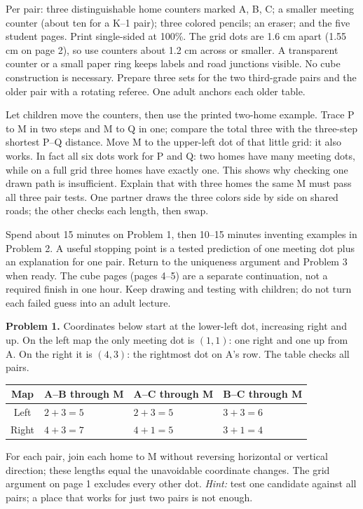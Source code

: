 \documentclass[11pt,letterpaper]{article}
\newcommand{\heading}[1]{\par\vspace{5pt}{\large\bfseries #1}\par\nobreak}
\begin{document}
\heading{Materials and a short launch}
Per pair: three distinguishable home counters marked A, B, C; a smaller meeting counter (about ten for a K--1 pair); three colored pencils; an eraser; and the five student pages. Print single-sided at 100\%. The grid dots are 1.6 cm apart (1.55 cm on page 2), so use counters about 1.2 cm across or smaller. A transparent counter or a small paper ring keeps labels and road junctions visible. No cube construction is necessary. Prepare three sets for the two third-grade pairs and the older pair with a rotating referee. One adult anchors each older table.

Let children move the counters, then use the printed two-home example. Trace P to M in two steps and M to Q in one; compare the total three with the three-step shortest P--Q distance. Move M to the upper-left dot of that little grid: it also works. In fact all six dots work for P and Q: two homes have many meeting dots, while on a full grid three homes have exactly one. This shows why checking one drawn path is insufficient. Explain that with three homes the same M must pass all three pair tests. One partner draws the three colors side by side on shared roads; the other checks each length, then swap.

\heading{Manageable first route}
Spend about 15 minutes on Problem 1, then 10--15 minutes inventing examples in Problem 2. A useful stopping point is a tested prediction of one meeting dot plus an explanation for one pair. Return to the uniqueness argument and Problem 3 when ready. The cube pages (pages 4--5) are a separate continuation, not a required finish in one hour. Keep drawing and testing with children; do not turn each failed guess into an adult lecture.
\newpage
\heading{Numbered answers and hints}
\textbf{Problem 1.} Coordinates below start at the lower-left dot, increasing right and up. On the left map the only meeting dot is \textbf{$(1,1)$}: one right and one up from A. On the right it is \textbf{$(4,3)$}: the rightmost dot on A's row. The table checks all pairs.
\begin{center}\renewcommand{\arraystretch}{1.15}
\begin{tabular}{@{}clll@{}}\toprule
Map & A--B through M & A--C through M & B--C through M\\\midrule
Left & $2+3=5$ & $2+3=5$ & $3+3=6$\\
Right & $4+3=7$ & $4+1=5$ & $3+1=4$\\\bottomrule
\end{tabular}\end{center}
For each pair, join each home to M without reversing horizontal or vertical direction; these lengths equal the unavoidable coordinate changes. The grid argument on page 1 excludes every other dot. \emph{Hint:} test one candidate against all pairs; a place that works for just two pairs is not enough.
\end{document}
